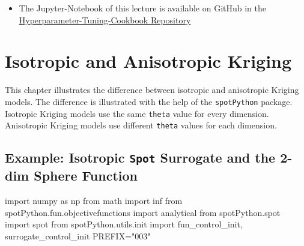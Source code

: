 \documentclass[
  letterpaper,
  DIV=11,
  numbers=noendperiod]{scrreprt}
\newenvironment{Shaded}{\begin{snugshade}}{\end{snugshade}}
\newcommand{\ImportTok}[1]{\textcolor[rgb]{0.00,0.46,0.62}{#1}}
\newcommand{\NormalTok}[1]{\textcolor[rgb]{0.00,0.23,0.31}{#1}}
\newcommand{\OperatorTok}[1]{\textcolor[rgb]{0.37,0.37,0.37}{#1}}
\newcommand{\StringTok}[1]{\textcolor[rgb]{0.13,0.47,0.30}{#1}}
\providecommand{\tightlist}{%
  \setlength{\itemsep}{0pt}\setlength{\parskip}{0pt}}\usepackage{longtable,booktabs,array}
\begin{document}
\begin{tcolorbox}[enhanced jigsaw, coltitle=black, bottomrule=.15mm, breakable, toprule=.15mm, colframe=quarto-callout-note-color-frame, title=\textcolor{quarto-callout-note-color}{\faInfo}\hspace{0.5em}{Note}, colbacktitle=quarto-callout-note-color!10!white, opacityback=0, left=2mm, leftrule=.75mm, colback=white, rightrule=.15mm, bottomtitle=1mm, toptitle=1mm, titlerule=0mm, arc=.35mm, opacitybacktitle=0.6]

\begin{itemize}
\tightlist
\item
  The Jupyter-Notebook of this lecture is available on GitHub in the
  \href{https://github.com/sequential-parameter-optimization/Hyperparameter-Tuning-Cookbook/blob/main/008_num_spot_multidim.ipynb}{Hyperparameter-Tuning-Cookbook
  Repository}
\end{itemize}

\end{tcolorbox}

\chapter{Isotropic and Anisotropic Kriging}\label{sec-iso-aniso-kriging}

This chapter illustrates the difference between isotropic and
anisotropic Kriging models. The difference is illustrated with the help
of the \texttt{spotPython} package. Isotropic Kriging models use the
same \texttt{theta} value for every dimension. Anisotropic Kriging
models use different \texttt{theta} values for each dimension.

\section{\texorpdfstring{Example: Isotropic \texttt{Spot} Surrogate and
the 2-dim Sphere
Function}{Example: Isotropic Spot Surrogate and the 2-dim Sphere Function}}\label{sec-spot-2d-sphere-iso}

\begin{Shaded}
\begin{Highlighting}[]
\ImportTok{import}\NormalTok{ numpy }\ImportTok{as}\NormalTok{ np}
\ImportTok{from}\NormalTok{ math }\ImportTok{import}\NormalTok{ inf}
\ImportTok{from}\NormalTok{ spotPython.fun.objectivefunctions }\ImportTok{import}\NormalTok{ analytical}
\ImportTok{from}\NormalTok{ spotPython.spot }\ImportTok{import}\NormalTok{ spot}
\ImportTok{from}\NormalTok{ spotPython.utils.init }\ImportTok{import}\NormalTok{ fun\_control\_init, surrogate\_control\_init}
\NormalTok{PREFIX}\OperatorTok{=}\StringTok{"003"}
\end{Highlighting}
\end{Shaded}
\end{document}

